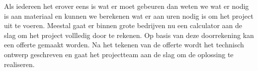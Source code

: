 
Als iedereen het erover eens is wat er moet gebeuren dan weten we wat er nodig is aan materiaal en kunnen we berekenen wat er aan uren nodig is om het project uit te voeren. Meestal gaat er binnen grote bedrijven nu een calculator aan de slag om het project vollledig door te rekenen. Op basis van deze doorrekening kan een offerte gemaakt worden. Na het tekenen van de offerte wordt het technisch ontwerp geschreven en gaat het projectteam aan de slag om de oplossing te realiseren.

